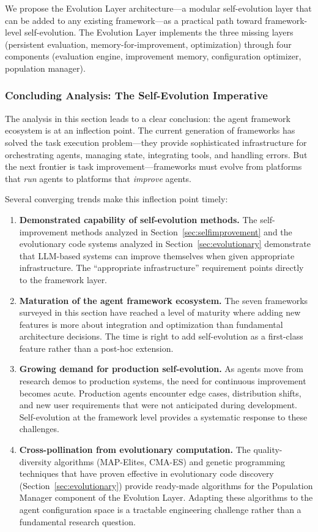 We propose the Evolution Layer architecture---a modular self-evolution layer that can be added to any existing framework---as a practical path toward framework-level self-evolution. The Evolution Layer implements the three missing layers (persistent evaluation, memory-for-improvement, optimization) through four components (evaluation engine, improvement memory, configuration optimizer, population manager).

\subsubsection{Concluding Analysis: The Self-Evolution Imperative}

The analysis in this section leads to a clear conclusion: the agent framework ecosystem is at an inflection point. The current generation of frameworks has solved the task execution problem---they provide sophisticated infrastructure for orchestrating agents, managing state, integrating tools, and handling errors. But the next frontier is task improvement---frameworks must evolve from platforms that \emph{run} agents to platforms that \emph{improve} agents.

Several converging trends make this inflection point timely:

\begin{enumerate}
    \item \textbf{Demonstrated capability of self-evolution methods.} The self-improvement methods analyzed in Section~\ref{sec:selfimprovement} and the evolutionary code systems analyzed in Section~\ref{sec:evolutionary} demonstrate that LLM-based systems can improve themselves when given appropriate infrastructure. The ``appropriate infrastructure'' requirement points directly to the framework layer.

    \item \textbf{Maturation of the agent framework ecosystem.} The seven frameworks surveyed in this section have reached a level of maturity where adding new features is more about integration and optimization than fundamental architecture decisions. The time is right to add self-evolution as a first-class feature rather than a post-hoc extension.

    \item \textbf{Growing demand for production self-evolution.} As agents move from research demos to production systems, the need for continuous improvement becomes acute. Production agents encounter edge cases, distribution shifts, and new user requirements that were not anticipated during development. Self-evolution at the framework level provides a systematic response to these challenges.

    \item \textbf{Cross-pollination from evolutionary computation.} The quality-diversity algorithms (MAP-Elites, CMA-ES) and genetic programming techniques that have proven effective in evolutionary code discovery (Section~\ref{sec:evolutionary}) provide ready-made algorithms for the Population Manager component of the Evolution Layer. Adapting these algorithms to the agent configuration space is a tractable engineering challenge rather than a fundamental research question.
\end{enumerate}

